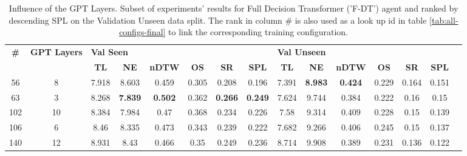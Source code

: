 \begin{table}
\centering
\caption{\label{tab:f_dt_layers}Influence of the GPT Layers. Subset of experiments' results for Full Decision Transformer ('F-DT') agent and ranked by descending SPL on the Validation Unseen data split. The rank in column \# is also used as a look up id in table \ref{tab:all-configs-final} to link the corresponding training configuration.}
\begin{tabular}{@{\hskip3pt}c@{\hskip3pt}c@{\hskip3pt}c@{\hskip3pt}c@{\hskip3pt}c@{\hskip3pt}c@{\hskip3pt}c@{\hskip3pt}c@{\hskip3pt}c@{\hskip3pt}c@{\hskip3pt}c@{\hskip3pt}c@{\hskip3pt}c@{\hskip3pt}c@{\hskip3pt}c}
\toprule
\textbf{\#} & \textbf{GPT Layers} & \multicolumn{6}{l}{\textbf{Val Seen}} & \multicolumn{6}{l}{\textbf{Val Unseen}} \\
 \textbf{~} &          \textbf{~} &       \textbf{TL} &     \textbf{NE} &   \textbf{nDTW} & \textbf{OS} &     \textbf{SR} &    \textbf{SPL} &         \textbf{TL} &     \textbf{NE} &   \textbf{nDTW} & \textbf{OS} & \textbf{SR} & \textbf{SPL} \\
\midrule
         56 &                   8 &             7.918 &           8.603 &           0.459 &       0.305 &           0.208 &           0.196 &               7.391 &  \textbf{8.983} &  \textbf{0.424} &       0.229 &       0.164 &        0.151 \\
         63 &                   3 &             8.268 &  \textbf{7.839} &  \textbf{0.502} &       0.362 &  \textbf{0.266} &  \textbf{0.249} &               7.624 &           9.744 &           0.384 &       0.222 &        0.16 &         0.15 \\
        102 &                  10 &             8.384 &           7.984 &            0.47 &       0.368 &           0.234 &           0.226 &                7.58 &           9.314 &           0.409 &       0.228 &        0.15 &        0.139 \\
        106 &                   6 &              8.46 &           8.335 &           0.473 &       0.343 &           0.239 &           0.222 &               7.682 &           9.266 &           0.406 &       0.245 &        0.15 &        0.137 \\
        140 &                  12 &             8.931 &            8.43 &           0.466 &        0.35 &           0.249 &           0.236 &               8.714 &           9.908 &           0.389 &       0.231 &       0.136 &        0.122 \\
\bottomrule
\end{tabular}
\end{table}
